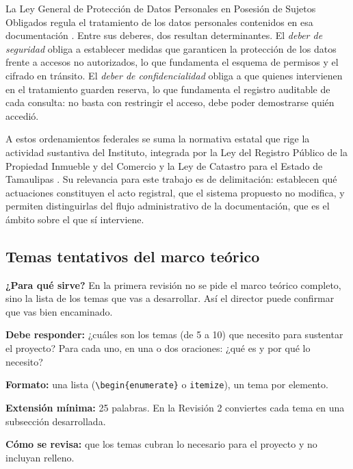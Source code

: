La Ley General de Protección de Datos Personales en Posesión de Sujetos Obligados regula el tratamiento de los datos personales contenidos en esa documentación \cite{lgpdppso2017}. Entre sus deberes, dos resultan determinantes. El \emph{deber de seguridad} obliga a establecer medidas que garanticen la protección de los datos frente a accesos no autorizados, lo que fundamenta el esquema de permisos y el cifrado en tránsito. El \emph{deber de confidencialidad} obliga a que quienes intervienen en el tratamiento guarden reserva, lo que fundamenta el registro auditable de cada consulta: no basta con restringir el acceso, debe poder demostrarse quién accedió.

A estos ordenamientos federales se suma la normativa estatal que rige la actividad sustantiva del Instituto, integrada por la Ley del Registro Público de la Propiedad Inmueble y del Comercio \cite{leyrpp2008} y la Ley de Catastro para el Estado de Tamaulipas \cite{leycatastro2001}. Su relevancia para este trabajo es de delimitación: establecen qué actuaciones constituyen el acto registral, que el sistema propuesto no modifica, y permiten distinguirlas del flujo administrativo de la documentación, que es el ámbito sobre el que sí interviene.

\subsection{Temas tentativos del marco teórico} \label{sec:temas_tentativos} %

\begin{guia}
\textbf{¿Para qué sirve?} En la primera revisión no se pide el marco teórico completo, sino la lista de los temas que
vas a desarrollar. Así el director puede confirmar que vas bien encaminado.

\textbf{Debe responder:} ¿cuáles son los temas (de 5 a 10) que necesito para sustentar el proyecto? Para cada uno, en una
o dos oraciones: ¿qué es y por qué lo necesito?

\textbf{Formato:} una lista (\verb|\begin{enumerate}| o \verb|itemize|), un tema por elemento.

\textbf{Extensión mínima:} 25 palabras. En la Revisión 2 conviertes cada tema en una subsección desarrollada.

\textbf{Cómo se revisa:} que los temas cubran lo necesario para el proyecto y no incluyan relleno.
\end{guia}

